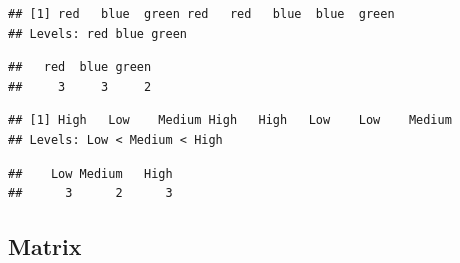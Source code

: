 \documentclass[]{book}
\newenvironment{Shaded}{\begin{snugshade}}{\end{snugshade}}
\newcommand{\KeywordTok}[1]{\textcolor[rgb]{0.13,0.29,0.53}{\textbf{{#1}}}}
\newcommand{\DataTypeTok}[1]{\textcolor[rgb]{0.13,0.29,0.53}{{#1}}}
\newcommand{\DecValTok}[1]{\textcolor[rgb]{0.00,0.00,0.81}{{#1}}}
\newcommand{\StringTok}[1]{\textcolor[rgb]{0.31,0.60,0.02}{{#1}}}
\newcommand{\CommentTok}[1]{\textcolor[rgb]{0.56,0.35,0.01}{\textit{{#1}}}}
\newcommand{\NormalTok}[1]{{#1}}
\theoremstyle{definition}
\theoremstyle{definition}
\theoremstyle{remark}
\begin{document}
\begin{verbatim}
## [1] red   blue  green red   red   blue  blue  green
## Levels: red blue green
\end{verbatim}

\begin{Shaded}
\end{Shaded}

\begin{verbatim}
##   red  blue green 
##     3     3     2
\end{verbatim}

\begin{Shaded}
\end{Shaded}

\begin{verbatim}
## [1] High   Low    Medium High   High   Low    Low    Medium
## Levels: Low < Medium < High
\end{verbatim}

\begin{Shaded}
\end{Shaded}

\begin{verbatim}
##    Low Medium   High 
##      3      2      3
\end{verbatim}

\subsection{Matrix}\label{matrix}
\end{document}
